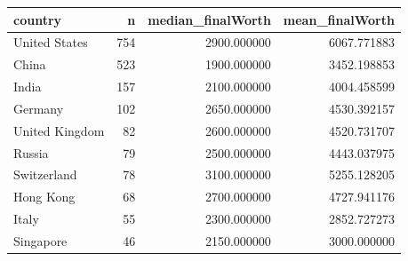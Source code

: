 \begin{tabular}{lrrr}
\toprule
country & n & median\_finalWorth & mean\_finalWorth \\
\midrule
United States & 754 & 2900.000000 & 6067.771883 \\
China & 523 & 1900.000000 & 3452.198853 \\
India & 157 & 2100.000000 & 4004.458599 \\
Germany & 102 & 2650.000000 & 4530.392157 \\
United Kingdom & 82 & 2600.000000 & 4520.731707 \\
Russia & 79 & 2500.000000 & 4443.037975 \\
Switzerland & 78 & 3100.000000 & 5255.128205 \\
Hong Kong & 68 & 2700.000000 & 4727.941176 \\
Italy & 55 & 2300.000000 & 2852.727273 \\
Singapore & 46 & 2150.000000 & 3000.000000 \\
\bottomrule
\end{tabular}
